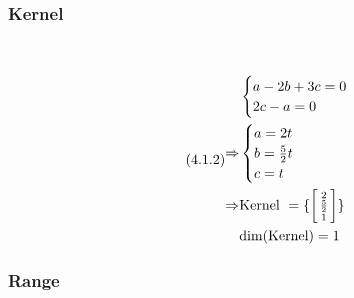 \documentclass{article}
\begin{document}
\subsubsection{Kernel}

~

\begin{equation}
\tag{4.1.2}
\begin{split}
&\begin{cases}
a-2b+3c=0\\
2c-a=0\\
\end{cases}\\
\Rightarrow &\begin{cases}
a=2t\\
b=\frac{5}{2}t\\
c=t\\
\end{cases}\\
\Rightarrow &\text{Kernel }=\{\begin{bsmallmatrix}2\\\frac{5}{2}\\1\end{bsmallmatrix}\}\\
&\text{dim}(\text{Kernel})=1\\
\end{split}
\end{equation}

\subsubsection{Range}

~
\end{document}
